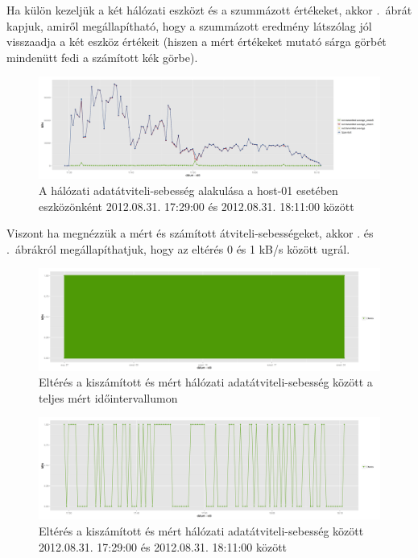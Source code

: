 \documentclass[a4paper,10pt,titlepage]{article}
\begin{document}
Ha külön kezeljük a két hálózati eszközt és a szummázott értékeket, akkor .~ábrát kapjuk, amiről megállapítható, hogy a szummázott eredmény látszólag jól visszaadja a két eszköz értékeit (hiszen a mért értékeket mutató sárga görbét mindenütt fedi a számított kék görbe).

\begin{figure}[h!]
\centering
\includegraphics[width=1.00\textwidth]{figures/net_transmitted_average_dev-20120831172900-20120831181100.png}
\caption{ A hálózati adatátviteli-sebesség alakulása a host-01 esetében eszközönként 2012.08.31. 17:29:00 és 2012.08.31. 18:11:00 között \label{fig:net_transmitted_average_dev}}
\end{figure}

Viszont ha megnézzük a mért és számított átviteli-sebességeket, akkor . és .~ábrákról megállapíthatjuk, hogy az eltérés 0 és 1 kB/s között ugrál. 

\begin{figure}[h!]
\centering
\includegraphics[width=1.00\textwidth]{figures/net_transmitted_average_diff-20120826230140-20120924083120.png}
\caption{ Eltérés a kiszámított és mért hálózati adatátviteli-sebesség között a teljes mért időintervallumon \label{fig:net_transmitted_average_diff-01}}
\end{figure}

\begin{figure}[h!]
\centering
\includegraphics[width=1.00\textwidth]{figures/net_transmitted_average_diff-20120831172900-20120831181100.png}
\caption{ Eltérés a kiszámított és mért hálózati adatátviteli-sebesség között 2012.08.31. 17:29:00 és 2012.08.31. 18:11:00 között \label{fig:net_transmitted_average_diff-02}}
\end{figure}
\end{document}
